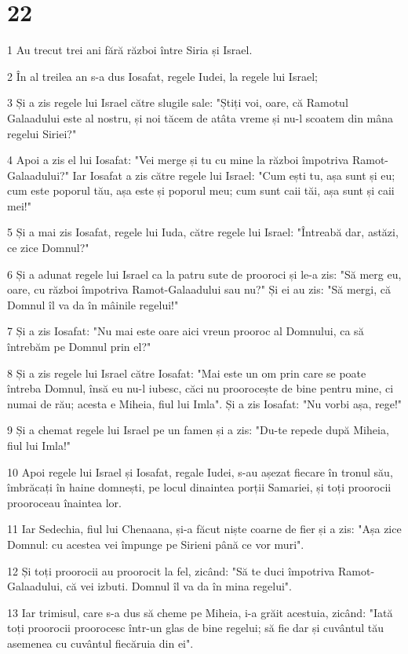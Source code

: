 \chapter{22}

\par 1 Au trecut trei ani fără război între Siria și Israel.
\par 2 În al treilea an s-a dus Iosafat, regele Iudei, la regele lui Israel;
\par 3 Și a zis regele lui Israel către slugile sale: "Știți voi, oare, că Ramotul Galaadului este al nostru, și noi tăcem de atâta vreme și nu-l scoatem din mâna regelui Siriei?"
\par 4 Apoi a zis el lui Iosafat: "Vei merge și tu cu mine la război împotriva Ramot-Galaadului?" Iar Iosafat a zis către regele lui Israel: "Cum ești tu, așa sunt și eu; cum este poporul tău, așa este și poporul meu; cum sunt caii tăi, așa sunt și caii mei!"
\par 5 Și a mai zis Iosafat, regele lui Iuda, către regele lui Israel: "Întreabă dar, astăzi, ce zice Domnul?"
\par 6 Și a adunat regele lui Israel ca la patru sute de prooroci și le-a zis: "Să merg eu, oare, cu război împotriva Ramot-Galaadului sau nu?" Și ei au zis: "Să mergi, că Domnul îl va da în mâinile regelui!"
\par 7 Și a zis Iosafat: "Nu mai este oare aici vreun prooroc al Domnului, ca să întrebăm pe Domnul prin el?"
\par 8 Și a zis regele lui Israel către Iosafat: "Mai este un om prin care se poate întreba Domnul, însă eu nu-l iubesc, căci nu proorocește de bine pentru mine, ci numai de rău; acesta e Miheia, fiul lui Imla". Și a zis Iosafat: "Nu vorbi așa, rege!"
\par 9 Și a chemat regele lui Israel pe un famen și a zis: "Du-te repede după Miheia, fiul lui Imla!"
\par 10 Apoi regele lui Israel și Iosafat, regale Iudei, s-au așezat fiecare în tronul său, îmbrăcați în haine domnești, pe locul dinaintea porții Samariei, și toți proorocii prooroceau înaintea lor.
\par 11 Iar Sedechia, fiul lui Chenaana, și-a făcut niște coarne de fier și a zis: "Așa zice Domnul: cu acestea vei împunge pe Sirieni până ce vor muri".
\par 12 Și toți proorocii au proorocit la fel, zicând: "Să te duci împotriva Ramot-Galaadului, că vei izbuti. Domnul îl va da în mina regelui".
\par 13 Iar trimisul, care s-a dus să cheme pe Miheia, i-a grăit acestuia, zicând: "Iată toți proorocii proorocesc într-un glas de bine regelui; să fie dar și cuvântul tău asemenea cu cuvântul fiecăruia din ei".
